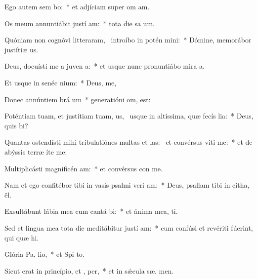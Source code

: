 \item Ego autem sem bo:~* et adjíciam super om  am.
\item Os meum annuntiábit justí am:~* tota die sa um.
\item Quóniam non cognóvi litteraram,~\pscross{} introíbo in potén mini:~* Dómine, memorábor justítiæ  us.
\item Deus, docuísti me a juven a:~* et usque nunc pronuntiábo mira a.
\item Et usque in senéc  nium:~* Deus,   me,
\item Donec annúntiem brá um~* generatióni om,   est:
\item Poténtiam tuam, et justítiam tuam, us,~\pscross{} usque in altíssima, quæ fecís lia:~* Deus, quis  bi?
\item Quantas ostendísti mihi tribulatiónes multas et las:~\pscross{} et convérsus viti me:~* et de abýssis terræ íte  me:
\item Multiplicásti magnificén am:~* et convérsus con  me.
\item Nam et ego confitébor tibi in vasis psalmi veri am:~* Deus, psallam tibi in cítha,  ël.
\item Exsultábunt lábia mea cum cantá bi:~* et ánima mea,  ti.
\item Sed et lingua mea tota die meditábitur justí am:~* cum confúsi et revériti fúerint, qui quæ  hi.
\item Glória Pa,  lio,~* et Spi to.
\item Sicut erat in princípio, et ,  per,~* et in sǽcula sæ. men.
